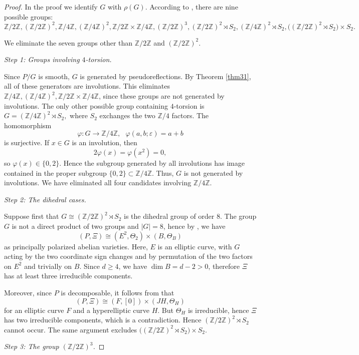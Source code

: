 \documentclass{article}
\numberwithin{equation}{section}
\newcommand{\ZZ}{\mathbb Z}
\newcommand{\eps}{\varepsilon}
\begin{document}
\begin{proof}
In the proof we identify $G$ with $\rho(G)$. According to \cite[Proposition 5.1]{ALN}, there are nine possible groups: $$\ZZ/2\ZZ, (\ZZ/2\ZZ)^2, \ZZ/4\ZZ, (\ZZ/4\ZZ)^2, \ZZ/2\ZZ \times \ZZ/4\ZZ, (\ZZ/2\ZZ)^3, (\ZZ/2\ZZ)^2\rtimes S_2, (\ZZ/4\ZZ)^2\rtimes S_2, \bigl((\ZZ/2\ZZ)^2\rtimes S_2\bigr)\times S_2.$$

We eliminate the seven groups other than $\ZZ/2\ZZ$ and $(\ZZ/2\ZZ)^2$.

\medskip
\noindent\textit{Step 1: Groups involving $4$-torsion.}

Since $P/G$ is smooth, $G$ is generated by pseudoreflections. By Theorem \ref{thm31}, all of these generators are involutions. This eliminates $\ZZ/4\ZZ, (\ZZ/4\ZZ)^2, \ZZ/2\ZZ\times \ZZ/4\ZZ$, since these groups are not generated by involutions. The only other possible group containing $4$-torsion is 
$G=(\ZZ/4\ZZ)^2\rtimes S_2,$ where $S_2$ exchanges the two $\ZZ/4$ factors. The homomorphism
$$\varphi\colon G\longrightarrow\ZZ/4\ZZ, \ \ \  \varphi(a,b;\eps)=a+b$$
is surjective. If $x\in G$ is an involution, then
\[
2\varphi(x)=\varphi(x^2)=0,
\]
so $\varphi(x)\in\{0,2\}$. Hence the subgroup generated by all involutions has image contained in the proper subgroup $\{0,2\}\subset\ZZ/4\ZZ$. Thus, $G$ is not generated by involutions. We have eliminated all four candidates involving $\ZZ/4\ZZ$.

\medskip
\noindent\textit{Step 2: The dihedral cases.}

Suppose first that $G\cong (\ZZ/2\ZZ)^2\rtimes S_2$ is the dihedral group of order 8. The group $G$ is not a direct product of two groups and $|G| = 8$, hence by \cite[Theorem 3.5]{ALA}, we have $$(P,\Xi)\cong(E^2,\Theta_2)\times(B,\Theta_B)$$ as principally polarized abelian varieties. Here, $E$ is an elliptic curve, with $G$ acting by the two coordinate sign changes and by permutation of the two factors on $E^2$ and trivially on $B$. Since $d\geq4$, we have $\dim B=d-2>0$, therefore $\Xi$ has at least three irreducible components.

Moreover, since $P$ is decomposable, it follows from \cite[Remark 4.2]{ALN} that
$$(P,\Xi)\cong(F,[0])\times(JH,\Theta_H)$$ for an elliptic curve $F$ and a hyperelliptic curve $H$. But $\Theta_H$ is irreducible, hence $\Xi$ has two irreducible components, which is a contradiction. Hence $(\ZZ/2\ZZ)^2\rtimes S_2$ cannot occur. The same argument excludes $\bigl((\ZZ/2\ZZ)^2\rtimes S_2\bigr)\times S_2$.

\medskip
\noindent\textit{Step 3: The group $(\ZZ/2\ZZ)^3$.}


\end{proof}
\end{document}
